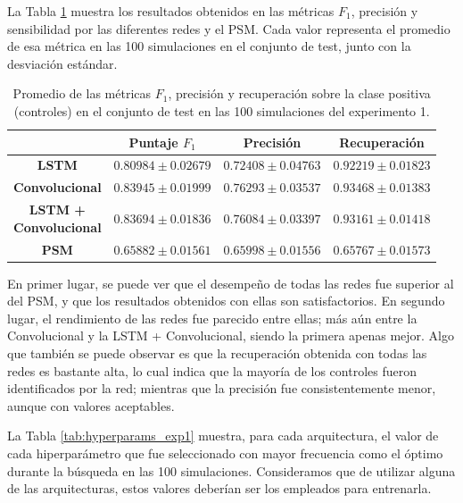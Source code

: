 \documentclass[../../main.tex]{subfiles}
\begin{document}
La Tabla \ref{tab:results_exp1} muestra los resultados obtenidos en las métricas \(F_1\),
precisión y sensibilidad por las diferentes redes y el PSM. Cada valor representa el
promedio de esa métrica en las 100 simulaciones en el conjunto de test, junto con la
desviación estándar.

\begin{table}[H]
    \centering
    \renewcommand{\arraystretch}{1.2}
    \begin{tabular}{|c|c|c|c|}
        \hline
         & \textbf{Puntaje} \(F_1\) & \textbf{Precisión} & \textbf{Recuperación} \\ \hline\hline
        \textbf{LSTM}
            & $0.80984 \pm 0.02679$ & $0.72408 \pm 0.04763$ & $0.92219 \pm 0.01823$ \\ \hline
        \textbf{Convolucional}
            & $\mathbf{0.83945 \pm 0.01999}$ & $\mathbf{0.76293 \pm 0.03537}$ & $\mathbf{0.93468 \pm 0.01383}$ \\ \hline
        \makecell{\textbf{LSTM +}\\\textbf{Convolucional}}
            & $0.83694 \pm 0.01836$ & $0.76084 \pm 0.03397$ & $0.93161 \pm 0.01418$ \\ \hline
        \textbf{PSM}
            & $0.65882 \pm 0.01561$ & $0.65998 \pm 0.01556$ & $0.65767 \pm 0.01573$ \\
        \hline
    \end{tabular}

    \caption{Promedio de las métricas \(F_1\), precisión y recuperación sobre la
    clase positiva (controles) en el conjunto de test en las 100 simulaciones del
    experimento 1.}
    \label{tab:results_exp1}
\end{table}

En primer lugar, se puede ver que el desempeño de todas las redes fue superior al del PSM,
y que los resultados obtenidos con ellas son satisfactorios. En segundo lugar, el
rendimiento de las redes fue parecido entre ellas; más aún entre la Convolucional y la
LSTM + Convolucional, siendo la primera apenas mejor. Algo que también se puede observar
es que la recuperación obtenida con todas las redes es bastante alta, lo cual indica que
la mayoría de los controles fueron identificados por la red; mientras que la precisión fue
consistentemente menor, aunque con valores aceptables.

La Tabla \ref{tab:hyperparams_exp1} muestra, para cada arquitectura, el valor de cada
hiperparámetro que fue seleccionado con mayor frecuencia como el óptimo durante la
búsqueda en las 100 simulaciones. Consideramos que de utilizar alguna de las
arquitecturas, estos valores deberían ser los empleados para entrenarla.
\end{document}
